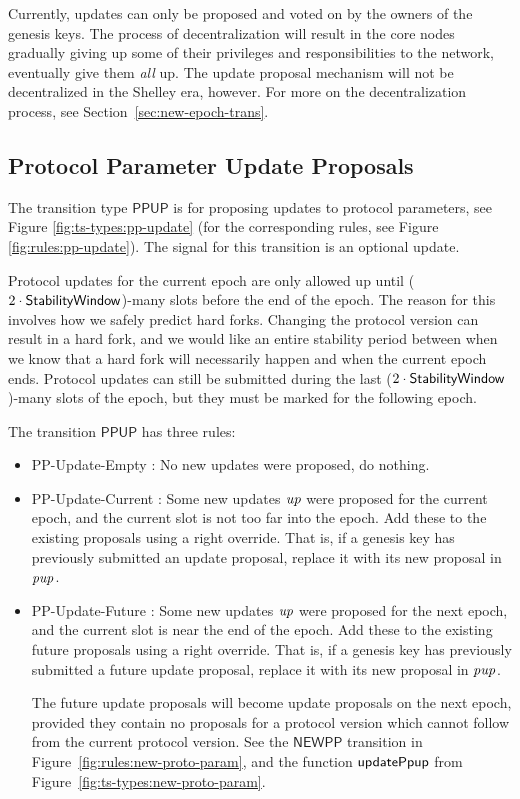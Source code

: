Currently, updates can only be proposed and voted on by the owners of the genesis keys.
The process of decentralization will result in the core nodes gradually giving up
some of their privileges and responsibilities to the network,
eventually give them \textit{all} up.
The update proposal mechanism will not be decentralized in the Shelley era, however.
For more on the decentralization process, see Section~\ref{sec:new-epoch-trans}.

\subsection{Protocol Parameter Update Proposals}
\label{sec:pp-proposals}

The transition type $\mathsf{PPUP}$ is for proposing updates to protocol
parameters, see Figure \ref{fig:ts-types:pp-update} (for the corresponding rules,
see Figure \ref{fig:rules:pp-update}).
The signal for this transition is an optional update.

Protocol updates for the current epoch are only allowed up until
($2\cdot\mathsf{StabilityWindow}$)-many slots before the end of the epoch.
The reason for this involves how we safely predict hard forks.
Changing the protocol version can result in a hard fork, and we would like an
entire stability period between when we know that a hard fork will necessarily happen
and when the current epoch ends.
Protocol updates can still be submitted during the last
($2\cdot\mathsf{StabilityWindow}$)-many slots of the epoch, but they must
be marked for the following epoch.

The transition $\mathsf{PPUP}$ has three rules:
\begin{itemize}
  \item PP-Update-Empty : No new updates were proposed, do nothing.
  \item PP-Update-Current : Some new updates $\mathit{up}$ were proposed
    for the current epoch, and the current slot is not too far into the epoch.
    Add these to the existing proposals using a right override. That is, if a genesis key
    has previously submitted an update proposal, replace it with its new
    proposal in $\mathit{pup}$.
  \item PP-Update-Future : Some new updates $\mathit{up}$ were proposed
    for the next epoch, and the current slot is near the end of the epoch.
    Add these to the existing future proposals using a right override. That is, if a genesis key
    has previously submitted a future update proposal, replace it with its new
    proposal in $\mathit{pup}$.

    The future update proposals will become update proposals on the next epoch,
    provided they contain no proposals for a protocol version which cannot follow
    from the current protocol version.
    See the $\mathsf{NEWPP}$ transition in Figure~\ref{fig:rules:new-proto-param},
    and the function $\mathsf{updatePpup}$ from Figure~\ref{fig:ts-types:new-proto-param}.
\end{itemize}

